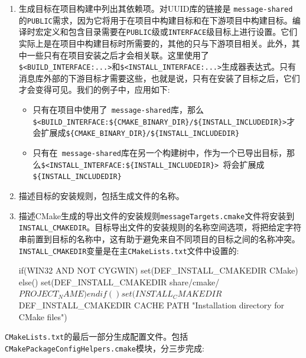 \begin{enumerate}
\item 生成目标在项目构建中列出其依赖项。对UUID库的链接是 \texttt{message-shared }的\texttt{PUBLIC}需求，因为它将用于在项目中构建目标和在下游项目中构建目标。编译时宏定义和包含目录需要在\texttt{PUBLIC}级或\texttt{INTERFACE}级目标上进行设置。它们实际上是在项目中构建目标时所需要的，其他的只与下游项目相关。此外，其中一些只有在项目安装之后才会相关联。这里使用了\texttt{ \$<BUILD\_INTERFACE:...>}和\texttt{\$<INSTALL\_INTERFACE:...>}生成器表达式。只有消息库外部的下游目标才需要这些，也就是说，只有在安装了目标之后，它们才会变得可见。我们的例子中，应用如下:

\begin{itemize}
\item 只有在项目中使用了\texttt{ message-shared}库，那么\texttt{\$<BUILD\_INTERFACE:\$\{CMAKE\_BINARY\_DIR\}/\$\{INSTALL\_INCLUDEDIR\}>}才会扩展成\texttt{\$\{CMAKE\_BINARY\_DIR\}/\$\{INSTALL\_INCLUDEDIR\} }

\item 只有在\texttt{ message-shared}库在另一个构建树中，作为一个已导出目标，那么\texttt{\$<INSTALL\_INTERFACE:\$\{INSTALL\_INCLUDEDIR\}> }将会扩展成\texttt{\$\{INSTALL\_INCLUDEDIR\}}

\end{itemize}

\item 描述目标的安装规则，包括生成文件的名称。

\item 描述CMake生成的导出文件的安装规则\texttt{messageTargets.cmake}文件将安装到\texttt{INSTALL\_CMAKEDIR}。目标导出文件的安装规则的名称空间选项，将把给定字符串前置到目标的名称中，这有助于避免来自不同项目的目标之间的名称冲突。\texttt{INSTALL\_CMAKEDIR}变量是在主\texttt{CMakeLists.txt}文件中设置的:

\begin{codebox}[cmake]
if(WIN32 AND NOT CYGWIN)
    set(DEF_INSTALL_CMAKEDIR CMake)
else()
    set(DEF_INSTALL_CMAKEDIR share/cmake/${PROJECT_NAME})
endif()
set(INSTALL_CMAKEDIR ${DEF_INSTALL_CMAKEDIR} CACHE PATH "Installation directory for CMake files")
\end{codebox}

\end{enumerate}

\texttt{CMakeLists.txt}的最后一部分生成配置文件。包括\texttt{ CMakePackageConfigHelpers.cmake}模块，分三步完成:

